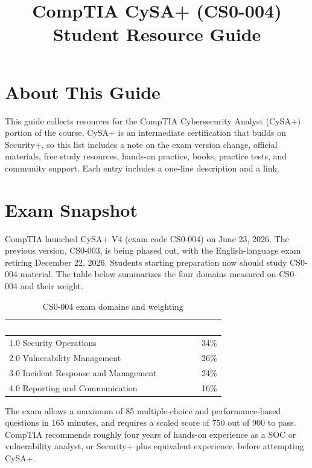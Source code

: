 \documentclass[11pt,letterpaper]{article}
\title{\color{navy}\textbf{CompTIA CySA+ (CS0-004)\\Student Resource Guide}}
\date{}
\author{}
\begin{document}
\maketitle
\thispagestyle{fancy}

\section*{About This Guide}
This guide collects resources for the CompTIA Cybersecurity Analyst (CySA+) portion of the course. CySA+ is an intermediate certification that builds on Security+, so this list includes a note on the exam version change, official materials, free study resources, hands-on practice, books, practice tests, and community support. Each entry includes a one-line description and a link.

\section{Exam Snapshot}
CompTIA launched CySA+ V4 (exam code CS0-004) on June 23, 2026. The previous version, CS0-003, is being phased out, with the English-language exam retiring December 22, 2026. Students starting preparation now should study CS0-004 material. The table below summarizes the four domains measured on CS0-004 and their weight.

\begin{table}[htbp]
\centering
\caption{CS0-004 exam domains and weighting}
\begin{tabular}{@{}p{0.72\linewidth}r@{}}
\toprule
\rowcolor{navy}
\textcolor{white}{\textbf{Domain}} & \textcolor{white}{\textbf{Weight}} \\
\midrule
1.0 Security Operations & 34\% \\
\rowcolor{lightrow} 2.0 Vulnerability Management & 26\% \\
3.0 Incident Response and Management & 24\% \\
\rowcolor{lightrow} 4.0 Reporting and Communication & 16\% \\
\bottomrule
\end{tabular}
\end{table}

The exam allows a maximum of 85 multiple-choice and performance-based questions in 165 minutes, and requires a scaled score of 750 out of 900 to pass. CompTIA recommends roughly four years of hands-on experience as a SOC or vulnerability analyst, or Security+ plus equivalent experience, before attempting CySA+.
\end{document}
